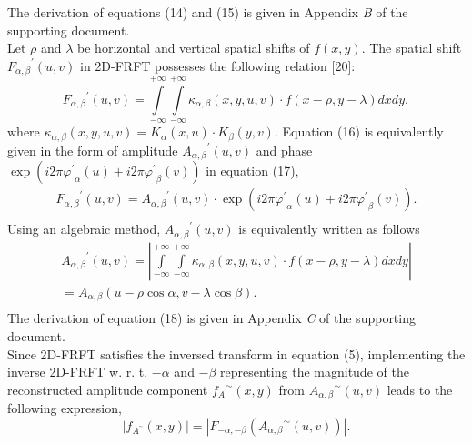 \documentclass[journal]{IEEEtran}
\begin{document}
The derivation of equations (14) and (15) is given in Appendix \emph{B} of the supporting document.\\\indent
Let $\rho$ and $\lambda$ be horizontal and vertical spatial shifts of $f(x,y)$. The spatial shift ${F_{\alpha ,\beta }}^{'}(u,v)$ in 2D-FRFT possesses the following relation [20]:
\begin{equation}
{F_{\alpha ,\beta }}^{'}(u,v) = \int\limits_{ - \infty }^{ + \infty } {\int\limits_{ - \infty }^{ + \infty } {{\kappa _{\alpha ,\beta }}(x,y,u,v) \cdot f(x - \rho ,y - \lambda )dxdy} },
\end{equation}
where ${\kappa _{\alpha ,\beta }}(x,y,u,v) = {K_\alpha }(x,u)\cdot{K_\beta }(y,v)$. Equation (16) is equivalently given in the form of amplitude ${A_{\alpha ,\beta }}^{'}(u,v)$ and phase $\exp (i2\pi {\varphi ^{'}}_\alpha (u) + i2\pi {\varphi ^{'}}_\beta (v))$ in equation (17),
\begin{equation}
\begin{array}{l}
 {F_{\alpha ,\beta }}^{'}(u,v) = {A_{\alpha ,\beta }}^{'}(u,v) \cdot \exp (i2\pi {\varphi ^{'}}_\alpha (u) + i2\pi {\varphi ^{'}}_\beta (v)). \\
 \end{array}
\end{equation}
Using an algebraic method, ${A_{\alpha ,\beta }}^{'}(u,v)$ is equivalently written as follows
\begin{equation}
\begin{array}{l}
 {A_{\alpha ,\beta }}^{'}(u,v) = \left| {\int\limits_{ - \infty }^{ + \infty } {\int\limits_{ - \infty }^{ + \infty } {{\kappa _{\alpha ,\beta }}(x,y,u,v)\cdot f(x - \rho ,y - \lambda )dxdy} } } \right| \\
  = {A_{\alpha ,\beta }}(u - \rho \cos \alpha ,v - \lambda \cos \beta ). \\
 \end{array}
\end{equation}
The derivation of equation (18) is given in Appendix \emph{C} of the supporting document.\\\indent Since 2D-FRFT satisfies the inversed transform in equation (5), implementing the inverse 2D-FRFT w. r. t. $-\alpha$ and $-\beta$ representing the magnitude of the reconstructed amplitude component ${f_{A}}^\sim(x,y)$ from ${A_{\alpha ,\beta }}^ \sim (u,v)$ leads to the following expression,
\begin{equation}
 \left| {{f_{{A^{^\sim}}}}\left( {x,y} \right)} \right| = \left| {{F_{ - \alpha , - \beta }}({A_{\alpha ,\beta }}^\sim(u,v))} \right|.
\end{equation}
\end{document}
